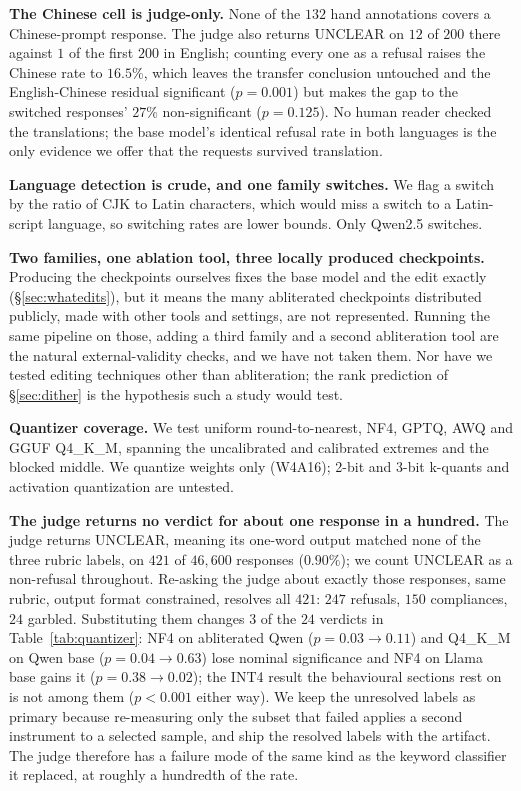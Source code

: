 \documentclass[conference,compsoc,letterpaper]{IEEEtran}
\begin{document}
\textbf{The Chinese cell is judge-only.} None of the $132$ hand annotations covers a Chinese-prompt response. The judge also returns UNCLEAR on $12$ of $200$ there against $1$ of the first $200$ in English; counting every one as a refusal raises the Chinese rate to $16.5\%$, which leaves the transfer conclusion untouched and the English-Chinese residual significant ($p=0.001$) but makes the gap to the switched responses' $27\%$ non-significant ($p=0.125$). No human reader checked the translations; the base model's identical refusal rate in both languages is the only evidence we offer that the requests survived translation.

\textbf{Language detection is crude, and one family switches.} We flag a switch by the ratio of CJK to Latin characters, which would miss a switch to a Latin-script language, so switching rates are lower bounds. Only Qwen2.5 switches.

\textbf{Two families, one ablation tool, three locally produced checkpoints.} Producing the checkpoints ourselves fixes the base model and the edit exactly (\S\ref{sec:whatedits}), but it means the many abliterated checkpoints distributed publicly, made with other tools and settings, are not represented. Running the same pipeline on those, adding a third family and a second abliteration tool are the natural external-validity checks, and we have not taken them. Nor have we tested editing techniques other than abliteration; the rank prediction of \S\ref{sec:dither} is the hypothesis such a study would test.

\textbf{Quantizer coverage.} We test uniform round-to-nearest, NF4, GPTQ, AWQ and GGUF Q4\_K\_M, spanning the uncalibrated and calibrated extremes and the blocked middle. We quantize weights only (W4A16); 2-bit and 3-bit k-quants and activation quantization are untested.

\textbf{The judge returns no verdict for about one response in a hundred.} The judge returns UNCLEAR, meaning its one-word output matched none of the three rubric labels, on $421$ of $46{,}600$ responses ($0.90\%$); we count UNCLEAR as a non-refusal throughout. Re-asking the judge about exactly those responses, same rubric, output format constrained, resolves all $421$: $247$ refusals, $150$ compliances, $24$ garbled. Substituting them changes $3$ of the $24$ verdicts in Table~\ref{tab:quantizer}: NF4 on abliterated Qwen ($p=0.03\!\to\!0.11$) and Q4\_K\_M on Qwen base ($p=0.04\!\to\!0.63$) lose nominal significance and NF4 on Llama base gains it ($p=0.38\!\to\!0.02$); the INT4 result the behavioural sections rest on is not among them ($p<0.001$ either way). We keep the unresolved labels as primary because re-measuring only the subset that failed applies a second instrument to a selected sample, and ship the resolved labels with the artifact. The judge therefore has a failure mode of the same kind as the keyword classifier it replaced, at roughly a hundredth of the rate.
\end{document}
